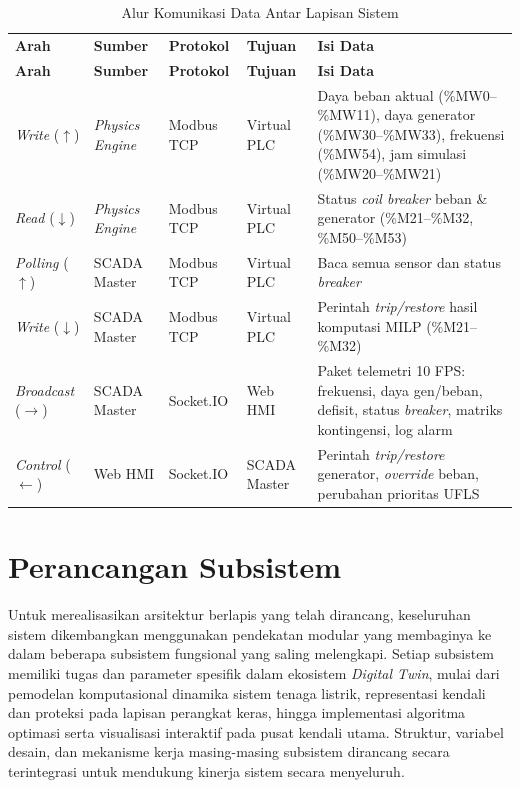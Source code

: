 \begin{longtable}{|p{1.8cm}|p{2.4cm}|p{2.2cm}|p{2.2cm}|p{5.8cm}|}
    \caption{Alur Komunikasi Data Antar Lapisan Sistem}
    \label{tab:komunikasi}
    \vspace{-0.75em}\\
    \hline
    \textbf{Arah} & \textbf{Sumber} & \textbf{Protokol} & \textbf{Tujuan} & \textbf{Isi Data} \\ \hline
    \endfirsthead
    \hline
    \textbf{Arah} & \textbf{Sumber} & \textbf{Protokol} & \textbf{Tujuan} & \textbf{Isi Data} \\ \hline
    \endhead
    \textit{Write} ($\uparrow$) & \textit{Physics Engine} & Modbus TCP & Virtual PLC &
        Daya beban aktual (\%MW0--\%MW11), daya generator (\%MW30--\%MW33), frekuensi (\%MW54), jam simulasi (\%MW20--\%MW21) \\ \hline
    \textit{Read} ($\downarrow$) & \textit{Physics Engine} & Modbus TCP & Virtual PLC &
        Status \textit{coil breaker} beban \& generator (\%M21--\%M32, \%M50--\%M53) \\ \hline
    \textit{Polling} ($\uparrow$) & SCADA Master & Modbus TCP & Virtual PLC &
        Baca semua sensor dan status \textit{breaker} \\ \hline
    \textit{Write} ($\downarrow$) & SCADA Master & Modbus TCP & Virtual PLC &
        Perintah \textit{trip/restore} hasil komputasi MILP (\%M21--\%M32) \\ \hline
    \textit{Broadcast} ($\rightarrow$) & SCADA Master & Socket.IO & Web HMI &
        Paket telemetri 10 FPS: frekuensi, daya gen/beban, defisit, status \textit{breaker}, matriks kontingensi, log alarm \\ \hline
    \textit{Control} ($\leftarrow$) & Web HMI & Socket.IO & SCADA Master &
        Perintah \textit{trip/restore} generator, \textit{override} beban, perubahan prioritas UFLS \\ \hline
\end{longtable}

\section{Perancangan Subsistem}
\label{sec:Perancangan_Subsistem}

Untuk merealisasikan arsitektur berlapis yang telah dirancang, keseluruhan sistem dikembangkan menggunakan pendekatan modular yang membaginya ke dalam beberapa subsistem fungsional yang saling melengkapi. Setiap subsistem memiliki tugas dan parameter spesifik dalam ekosistem \textit{Digital Twin}, mulai dari pemodelan komputasional dinamika sistem tenaga listrik, representasi kendali dan proteksi pada lapisan perangkat keras, hingga implementasi algoritma optimasi serta visualisasi interaktif pada pusat kendali utama. Struktur, variabel desain, dan mekanisme kerja masing-masing subsistem dirancang secara terintegrasi untuk mendukung kinerja sistem secara menyeluruh.

